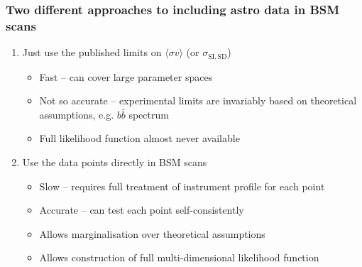 \documentclass[xcolor=dvipsnames]{beamer}
\begin{document}
\begin{frame}

  \frametitle{Two different approaches to including astro data in BSM scans}



  \begin{enumerate}

  \item{Just use the published limits on $\langle \sigma v\rangle$ (or $\sigma_\mathrm{SI,SD}$)}

    \begin{itemize}

    \item{Fast -- can cover large parameter spaces}

    \item{Not so accurate -- experimental limits are invariably based on theoretical assumptions, e.g. $b\bar b$ spectrum}

    \item{Full likelihood function almost never available}

    \end{itemize}

  \item\alert<2-3>{Use the data points directly in BSM scans} 

    \begin{itemize}

    \item{Slow -- requires full treatment of instrument profile for each point}

    \item{Accurate -- can test each point self-consistently}

    \item{Allows marginalisation over theoretical assumptions}

    \item{Allows construction of full multi-dimensional likelihood function}

    \end{itemize}


  \end{enumerate}

\end{frame}
\end{document}
